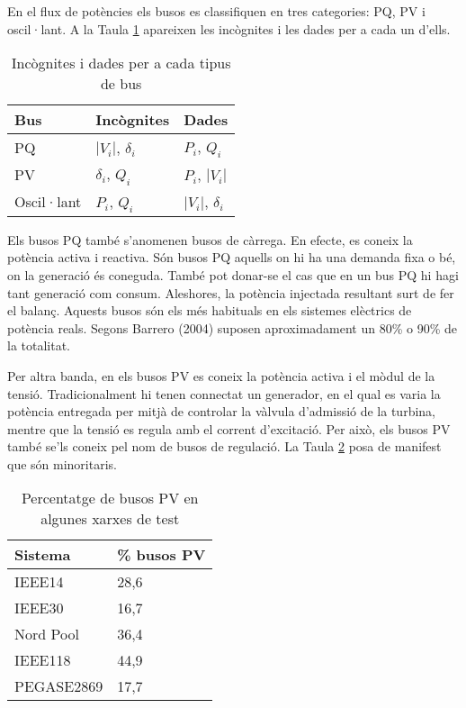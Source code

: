 En el flux de potències els busos es classifiquen en tres categories: PQ, PV i oscil·lant. A la Taula \ref{tab:T1} apareixen les incògnites i les dades per a cada un d'ells.

\begin{table}[!htb]
    \begin{center}
    \begin{tabular}{lll}
    \hline
    Bus & Incògnites & Dades\\
    \hline
    \hline
    PQ & $|V_i|$, $\delta_i$ & $P_i$, $Q_i$\\
    PV & $\delta_i$, $Q_i$ & $P_i$, $|V_i|$\\
    Oscil·lant & $P_i$, $Q_i$ & $|V_i|$, $\delta_i$\\
    \hline 
    \end{tabular}
    \caption{Incògnites i dades per a cada tipus de bus}
    \label{tab:T1}
    \end{center}
  \end{table}

Els busos PQ també s'anomenen busos de càrrega. En efecte, es coneix la potència activa i reactiva. Són busos PQ aquells on hi ha una demanda fixa o bé, on la generació és coneguda. També pot donar-se el cas que en un bus PQ hi hagi tant generació com consum. Aleshores, la potència injectada resultant surt de fer el balanç. Aquests busos són els més habituals en els sistemes elèctrics de potència reals. Segons Barrero (2004) suposen aproximadament un 80\% o 90\% de la totalitat.

Per altra banda, en els busos PV es coneix la potència activa i el mòdul de la tensió. Tradicionalment hi tenen connectat un generador, en el qual es varia la potència entregada per mitjà de controlar la vàlvula d'admissió de la turbina, mentre que la tensió es regula amb el corrent d'excitació. Per això, els busos PV també se'ls coneix pel nom de busos de regulació. La Taula \ref{tab:T2} posa de manifest que són minoritaris.

\begin{table}[!htb]
    \begin{center}
    \begin{tabular}{ll}
    \hline
    Sistema & \% busos PV\\
    \hline
    \hline
    IEEE14 & 28,6\\
    IEEE30 & 16,7\\
    Nord Pool & 36,4\\
    IEEE118 & 44,9\\
    PEGASE2869 & 17,7\\
    \hline 
    \end{tabular}
    \caption{Percentatge de busos PV en algunes xarxes de test}
    \label{tab:T2}
    \end{center}
  \end{table}

